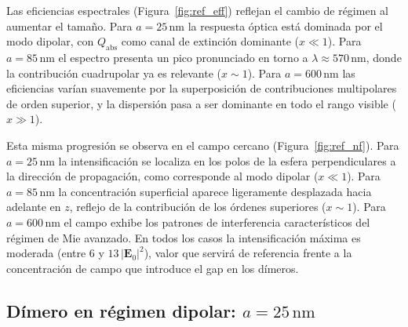 Las eficiencias espectrales (Figura~\ref{fig:ref_eff}) reflejan el cambio de
régimen al aumentar el tamaño. Para $a=25\,\text{nm}$ la respuesta óptica está
dominada por el modo dipolar, con $Q_\text{abs}$ como canal de extinción
dominante ($x\ll1$). Para $a=85\,\text{nm}$ el espectro presenta un pico
pronunciado en torno a $\lambda\approx570\,\text{nm}$, donde la contribución
cuadrupolar ya es relevante ($x\sim1$). Para $a=600\,\text{nm}$ las eficiencias
varían suavemente por la superposición de contribuciones multipolares de orden
superior, y la dispersión pasa a ser dominante en todo el rango visible
($x\gg1$).

Esta misma progresión se observa en el campo cercano (Figura~\ref{fig:ref_nf}).
Para $a=25\,\text{nm}$ la intensificación se localiza en los polos de la esfera
perpendiculares a la dirección de propagación, como corresponde al modo dipolar
($x\ll1$). Para $a=85\,\text{nm}$ la concentración superficial aparece
ligeramente desplazada hacia adelante en $z$, reflejo de la
contribución de los órdenes superiores ($x\sim1$). Para $a=600\,\text{nm}$ el
campo exhibe los patrones de interferencia característicos del régimen de Mie
avanzado. En todos los casos la intensificación máxima es moderada (entre $6$ y
$13\,|\mathbf{E}_0|^2$), valor que servirá de referencia frente a la
concentración de campo que introduce el gap en los dímeros.

\subsection{Dímero en régimen dipolar: $a = 25\,\text{nm}$}
\label{subsec:dimero_a25}



